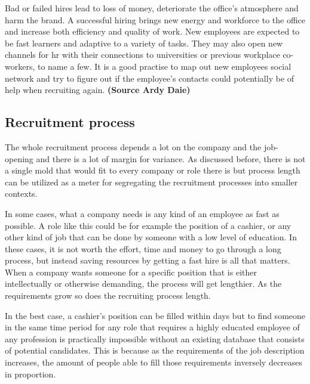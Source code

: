 \documentclass[11pt,a4paper,oneside,article]{memoir}
\begin{document}
Bad or failed hires lead to loss of money, deteriorate the office's atmosphere and harm the brand. A successful hiring brings new energy and workforce to the office and increase both efficiency and quality of work. New employees are expected to be fast learners and adaptive to a variety of tasks. \cite[p.~100]{viitala:book} They may also open new channels for \gls{hr} with their connections to universities or previous workplace co-workers, to name a few. It is a good practise to map out new employees social network and try to figure out if the employee's contacts could potentially be of help when recruiting again. \textbf{(Source Ardy Daie)}

\subsection{Recruitment process}

The whole recruitment process depends a lot on the company and the job-opening and there is a lot of margin for variance. As discussed before, there is not a single mold that would fit to every company or role there is but process length can be utilized as a meter for segregating the recruitment processes into smaller contexts.

In some cases, what a company needs is any kind of an employee as fast as possible. A role like this could be for example the position of a cashier, or any other kind of job that can be done by someone with a low level of education. In these cases, it is not worth the effort, time and money to go through a long process, but instead saving resources by getting a fast hire is all that matters. When a company wants someone for a specific position that is either intellectually or otherwise demanding, the process will get lengthier. As the requirements grow so does the recruiting process length.

In the best case, a cashier's position can be filled within days but to find someone in the same time period for any role that requires a highly educated employee of any profession is practically impossible without an existing database that consists of potential candidates. This is because as the requirements of the job description increases, the amount of people able to fill those requirements inversely decreases in proportion.
\end{document}

